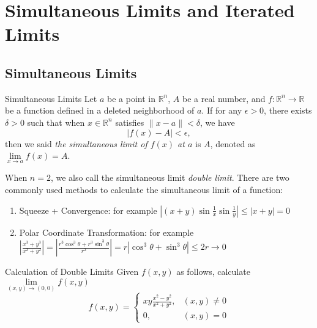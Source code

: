 

\section{Simultaneous Limits and Iterated Limits}

\subsection{Simultaneous Limits}

\begin{definition}{Simultaneous Limits}{}
  Let $a$ be a point in $\mathbb{R}^n$,
  $A$ be a real number,
  and $f: \mathbb{R}^n \rightarrow \mathbb{R}$ be a function defined in
  a deleted neighborhood of $a$.
  If for any $\epsilon > 0$, there exists $\delta > 0$ such that
  when $x \in \mathbb{R}^n$ satisfies $\|x - a\| < \delta$,
  we have
  \begin{equation}
   |f(x) - A| < \epsilon,
  \end{equation}
  then we said \emph{the simultaneous limit of $f(x)$ at $a$} is $A$,
  denoted as $\lim \limits _{x \rightarrow a} f(x) = A$.
\end{definition}

\begin{note}
  When $n = 2$, we also call the simultaneous limit \emph{double limit}.
  There are two commonly used methods to calculate the simultaneous limit of a function:
  \begin{enumerate}
  \item Squeeze + Convergence: for example $\left|(x+y)\sin\frac{1}{x}\sin\frac{1}{y}\right|\leq|x+y|=0$
  \item Polar Coordinate Transformation: for example
    $\left|{\frac{x^{3}+y^{3}}{x^{2}+y^{2}}}\right|=\left|{\frac{r^{3}\cos^{3}\theta+r^{3}\sin^{3}\theta}{r^{2}}}\right|=r|\cos^{3}\theta+\sin^{3}\theta|\leq2r\rightarrow
    0$
  \end{enumerate}
\end{note}

\begin{example}{Calculation of Double Limits}{}
  Given $f(x, y)$ as follows, calculate $\lim \limits _{(x,y) \rightarrow (0,
    0)} f(x,y)$
  \begin{equation}
    f(x,y)=
    \begin{cases}
      xy\frac{x^2-y^2}{x^2+y^2},&(x,y)\neq 0\\
      0,&(x,y)=0
    \end{cases}
  \end{equation}
\end{example}

